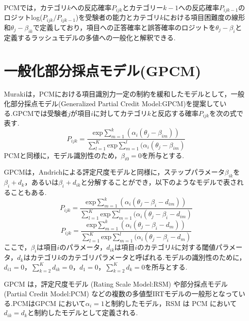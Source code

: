 \documentclass[a4paper,11pt,oneside,openany]{jsbook}
\begin{document}
PCMでは，カテゴリ$k$への反応確率$P_{ijk}$とカテゴリー$k-1$への反応確率$P_{ijk-1}$のロジットlog($P_{ijk}/P_{ijk-1}$)を受験者の能力とカテゴリ$k$における項目困難度の線形和$\theta_{j}-\beta_{ik}$で定義しており，項目への正答確率と誤答確率のロジットを$\theta_{j}-\beta_{i}$と定義するラッシュモデルの多値への一般化と解釈できる.

\section{一般化部分採点モデル(GPCM)}
Murakiは，PCMにおける項目識別力一定の制約を緩和したモデルとして，一般化部分採点モデル(Generalized Partial Credit Model:GPCM)\cite{GPCM}を提案している.GPCMでは受験者$j$が項目$i$に対してカテゴリ$k$と反応する確率$P_{ijk}$を次の式で表す.
\begin{displaymath}
P_{ijk} = \frac{\mathrm{exp}\sum_{m=1}^{k}(\alpha_{i}(\theta_{j}-\beta_{im}))}{\sum_{l=1}^{K} \mathrm{exp}\sum_{m=1}^{l}(\alpha_{i}(\theta_{j}-\beta_{im})}
\end{displaymath}
PCMと同様に，モデル識別性のため，$\beta_{i0}=0$を所与とする.

GPCMは，Andrichによる評定尺度モデル\cite{RSM}と同様に，ステップパラメータ$\beta_{ik}$を$\beta_{i}+d_{k}$，あるいは$\beta_{i}+d_{ik}$と分解することができ，以下のようなモデルで表されることもある.
\begin{displaymath}
P_{ijk} = \frac{\mathrm{exp}\sum_{m=1}^{k}(\alpha_{i}(\theta_{j}-\beta_{i}-d_{im}))}{\sum_{l=1}^{K} \mathrm{exp}\sum_{m=1}^{l}(\alpha_{i}(\theta_{j}-\beta_{i}-d_{im})}
\end{displaymath}
\begin{displaymath}
P_{ijk} = \frac{\mathrm{exp}\sum_{m=1}^{k}(\alpha_{i}(\theta_{j}-\beta_{i}-d_{m}))}{\sum_{l=1}^{K} \mathrm{exp}\sum_{m=1}^{l}(\alpha_{i}(\theta_{j}-\beta_{i}-d_{m})}
\end{displaymath}
ここで，$\beta_{i}$は項目$i$のパラメータ，$d_{ik}$は項目$i$のカテゴリ$k$に対する閾値パラメータ，$d_k$はカテゴリ$k$のカテゴリパラメータと呼ばれる.モデルの識別性のために，$d_{i1}=0，\sum_{k=2}^{K}d_{ik}=0，d_1=0，\sum_{k=2}^{K}d_{k}=0$を所与とする.

GPCM は，評定尺度モデル (Rating Scale Model:RSM) \cite{RSM}や部分採点モデル (Partial Credit Model:PCM) \cite{PCM}などの複数の多値型IRTモデルの一般形となっている.PCMはGPCM において$\alpha_i=1$と制約したモデル，RSM は PCM において$d_{ik}=d_k$と制約したモデルとして定義される.


\newpage
\end{document}
